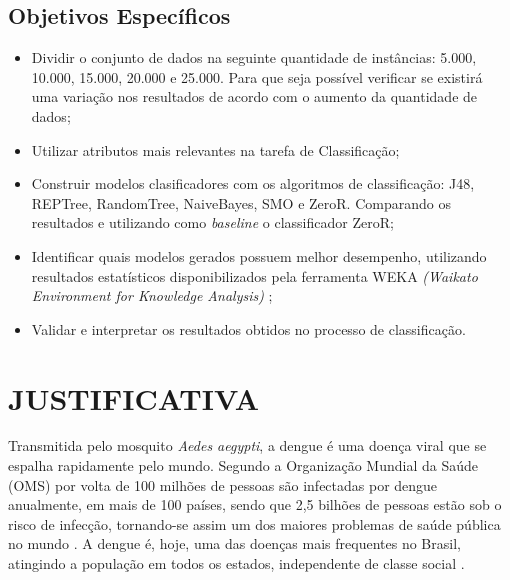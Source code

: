 \documentclass[
	12pt,				%
	openright,			%
	oneside,	
	a4paper,				%
	english,				%
	brazil				%
]{abntex2/abntex2} %
\begin{document}
		\subsection{Objetivos Específicos}
		\vspace{1\baselineskip}
		\begin{itemize}
			\item Dividir o conjunto de dados na seguinte quantidade de instâncias: 5.000, 10.000, 15.000, 20.000 e 25.000. Para que seja possível verificar se existirá uma variação nos resultados de acordo com o aumento da quantidade de dados;
			
			\item Utilizar atributos mais relevantes na tarefa de Classificação;
			
			\item Construir modelos clasificadores com os algoritmos de classificação: J48, REPTree, RandomTree, NaiveBayes, SMO e ZeroR. Comparando os resultados e utilizando como \textit{baseline} o classificador ZeroR;

			\item Identificar quais modelos gerados possuem melhor desempenho, utilizando resultados estatísticos disponibilizados pela ferramenta WEKA \textit{(Waikato Environment for Knowledge Analysis)} ;
			
			\item Validar e interpretar os resultados obtidos no processo de classificação.
		\end{itemize}
		\vspace{-1.5\baselineskip}
	\section{JUSTIFICATIVA}
	\vspace{1\baselineskip}

	Transmitida pelo mosquito \textit{Aedes aegypti}, a dengue é uma doença viral que se espalha rapidamente pelo mundo. Segundo a Organização Mundial da Saúde (OMS) por volta de 100 milhões de pessoas são infectadas por dengue anualmente, em mais de 100 países, sendo que 2,5 bilhões de pessoas estão sob o risco de infecção, tornando-se assim um dos maiores problemas de saúde pública no mundo \cite{bhatt:2013}. A dengue é, hoje, uma das doenças mais frequentes no Brasil, atingindo a população em todos os estados, independente de classe social \cite{saude:2008}.
	
\end{document}

